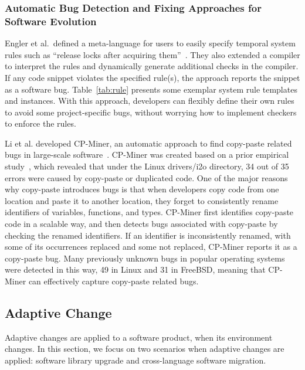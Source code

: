\documentclass[runningheads,a4paper]{llncs}
\begin{document}
\subsubsection{Automatic Bug Detection and Fixing Approaches for Software Evolution} 
Engler et al.~defined a meta-language for users to easily specify temporal system rules such as ``release locks after acquiring them''~\cite{Engler2000:CSR}. They also extended a compiler to interpret the rules and dynamically generate additional checks in the compiler. If any code snippet violates the specified rule(s), the approach reports the snippet as a software bug. Table~\ref{tab:rule} presents some exemplar system rule templates and instances. 
With this approach, developers can flexibly define their own rules to avoid some project-specific bugs, without worrying how to implement checkers to enforce the rules.

Li et al. developed CP-Miner, an automatic approach to find copy-paste related bugs in large-scale software~\cite{Li2006:CPMiner}. CP-Miner was created based on a prior empirical study~\cite{Chou2001:ESO}, which revealed that under the Linux {\sf drivers/i2o} directory, 34 out of 35 errors were caused by copy-paste or duplicated code. 
One of the major reasons why copy-paste introduces bugs is that when developers copy code from one location and paste it to another location, they forget to consistently rename identifiers of variables, functions, and types. CP-Miner first identifies copy-paste code in a scalable way, and then detects bugs associated with copy-paste by checking the renamed identifiers. If an identifier is inconsistently renamed, with some of its occurrences replaced and some not replaced, CP-Miner reports it as a copy-paste bug. Many previously unknown bugs in popular operating systems were detected in this way, 49 in Linux and 31 in FreeBSD, meaning that CP-Miner can effectively capture copy-paste related bugs. 
 
\subsection{Adaptive Change}
\label{sec:adaptive}
Adaptive changes are applied to a software product, when its environment changes. In this section, we focus on two scenarios when adaptive changes are applied: software library upgrade and cross-language software migration.
\end{document}
